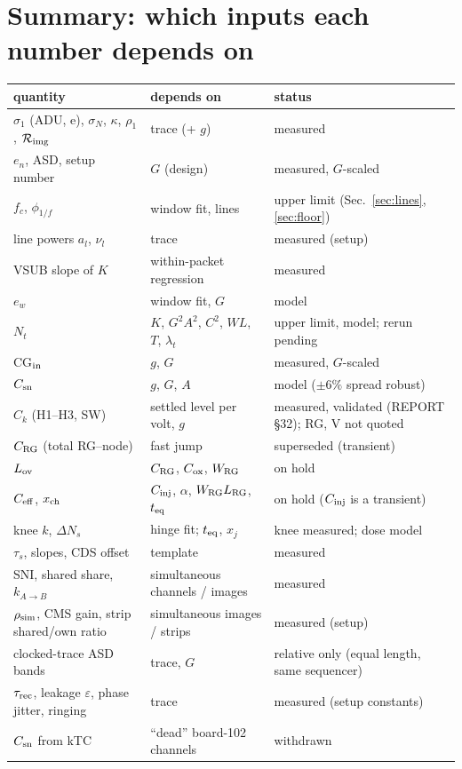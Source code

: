 \documentclass[10pt,a4paper]{article}
\begin{document}
\section{Summary: which inputs each number depends on}

\begin{center}\small
\begin{tabularx}{\linewidth}{@{}lXl@{}}\toprule
quantity & depends on & status\\\midrule
$\sigma_1$ (ADU, e), $\sigma_N$, $\kappa$, $\rho_1$, $\mathcal R_{\rm img}$ & trace (+ $g$) & measured\\
$e_n$, ASD, setup number & $G$ (design) & measured, $G$-scaled\\
$f_c$, $\phi_{1/f}$ & window fit, lines & upper limit (Sec.~\ref{sec:lines}, \ref{sec:floor})\\
line powers $a_l$, $\nu_l$ & trace & measured (setup)\\
VSUB slope of $K$ & within-packet regression & measured\\
$e_w$ & window fit, $G$ & model\\
$N_t$ & $K$, $G^2A^2$, $C^2$, $WL$, $T$, $\lambda_t$ & upper limit, model; rerun pending\\
CG$_{\rm in}$ & $g$, $G$ & measured, $G$-scaled\\
$C_{\rm sn}$ & $g$, $G$, $A$ & model ($\pm6\%$ spread robust)\\
$C_k$ (H1--H3, SW) & settled level per volt, $g$ & measured, validated (REPORT \S32); RG, V not quoted\\
$C_{\rm RG}$ (total RG--node) & fast jump & superseded (transient)\\
$L_{\rm ov}$ & $C_{\rm RG}$, $C_{\rm ox}$, $W_{\rm RG}$ & on hold\\
$C_{\rm eff}$, $x_{\rm ch}$ & $C_{\rm inj}$, $\alpha$, $W_{\rm RG}L_{\rm RG}$, $t_{\rm eq}$ & on hold ($C_{\rm inj}$ is a transient)\\
knee $k$, $\Delta N_s$ & hinge fit; $t_{\rm eq}$, $x_j$ & knee measured; dose model\\
$\tau_s$, slopes, CDS offset & template & measured\\
SNI, shared share, $k_{A\to B}$ & simultaneous channels / images & measured\\
$\rho_{\rm sim}$, CMS gain, strip shared/own ratio & simultaneous images / strips & measured (setup)\\
clocked-trace ASD bands & trace, $G$ & relative only (equal length, same sequencer)\\
$\tau_{\rm rec}$, leakage $\varepsilon$, phase jitter, ringing & trace & measured (setup constants)\\
$C_{\rm sn}$ from kTC & ``dead'' board-102 channels & withdrawn\\\bottomrule
\end{tabularx}
\end{center}
\end{document}
